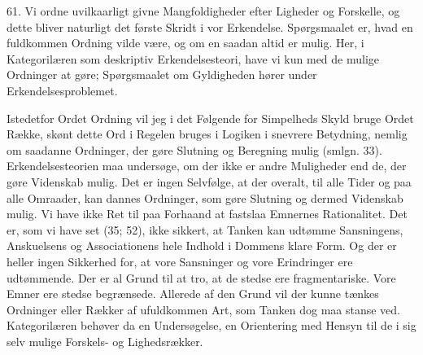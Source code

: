 \documentclass[12pt,a4paper]{book}
\newcommand{\apage}[1]{\marginnote{\footnotesize\textit{[#1]}}}
\begin{document}
61. Vi ordne uvilkaarligt givne Mangfoldigheder efter Ligheder og Forskelle,
og dette bliver naturligt det første Skridt i vor Erkendelse. Spørgsmaalet er,
hvad en fuldkommen Ordning vilde være, og om en saadan altid er mulig. Her, i
Kategorilæren som deskriptiv Erkendelsesteori, have vi kun med de mulige
Ordninger at gøre; Spørgsmaalet om Gyldigheden hører under
Erkendelsesproblemet.

Istedetfor Ordet Ordning vil jeg i det Følgende for Simpelheds Skyld bruge
Ordet Række, skønt dette Ord i Regelen bruges i Logiken i snevrere Betydning,
nemlig om saadanne Ordninger, der gøre Slutning og Beregning mulig (smlgn.
33). Erkendelsesteorien maa undersøge, om der ikke er andre Muligheder end de,
der gøre Videnskab mulig. Det er ingen Selvfølge, at der overalt, til alle
Tider og paa alle Omraader, kan dannes Ordninger, som gøre Slutning og dermed
Videnskab mulig. Vi have ikke Ret til paa Forhaand at fastslaa Emnernes
Rationalitet. Det er, som vi have set (35; 52), ikke sikkert, at Tanken kan
udtømme Sansningens, Anskuelsens og Associationens hele Indhold i Dommens
klare Form. Og der er heller ingen Sikkerhed for, at vore Sansninger og vore
Erindringer ere udtømmende. Der er al Grund til at tro, at de stedse ere
fragmentariske. Vore \apage{163} Emner ere stedse begrænsede. Allerede af den Grund vil
der kunne tænkes Ordninger eller Rækker af ufuldkommen Art, som Tanken dog maa
stanse ved. Kategorilæren behøver da en Undersøgelse, en Orientering med
Hensyn til de i sig selv mulige Forskels- og Lighedsrækker.
\end{document}
